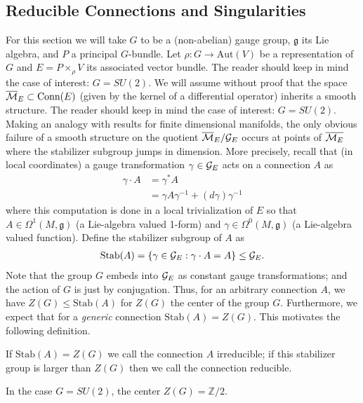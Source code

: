 \documentclass[12pt, onecolumn]{article}
\newenvironment{definition}[1][Definition]{\begin{trivlist}
\item[\hskip \labelsep {\bfseries #1}]}{\end{trivlist}}
\newenvironment{remark}[1][Remark]{\begin{trivlist}
\item[\hskip \labelsep {\bfseries #1}]}{\end{trivlist}}
\begin{document}
\subsection{Reducible Connections and Singularities}
\label{sec_redconn}
For this section we will take $G$ to be a (non-abelian) gauge group, $\mathfrak{g}$ its Lie algebra, and $P$ a principal $G$-bundle.  Let $\rho: G \rightarrow \text{Aut}(V)$ be a representation of $G$ and $E=P \times_{\rho} V$ its associated vector bundle.  The reader should keep in mind the case of interest: $G=SU(2)$.  We will assume without proof that the space $\overline{\cal{M}}_{E} \subset \text{Conn}(E)$ (given by the kernel of a differential operator) inherits a smooth structure.  The reader should keep in mind the case of interest: $G=SU(2)$.   Making an analogy with results for finite dimensional manifolds, the only obvious failure of a smooth structure on the quotient $\overline{\cal{M}}_{E}/{\cal G}_{E}$ occurs at points of $\overline{{\cal M}_{E}}$ where the stabilizer subgroup jumps in dimension.  More precisely, recall that (in local coordinates) a gauge transformation $\gamma \in {\cal G}_{E}$ acts on a connection $A$ as
\begin{align*}
\gamma \cdot A &= \gamma^*A\\
&= \gamma A \gamma^{-1} + (d\gamma) \gamma^{-1} 
\end{align*}
where this computation is done in a local trivialization of $E$ so that $A \in \Omega^{1}(M,\mathfrak{g})$ (a Lie-algebra valued 1-form) and $\gamma \in \Omega^{0}(M,\mathfrak{g})$ (a Lie-algebra valued function).  Define the stabilizer subgroup of $A$ as
\begin{align*}
\text{Stab}(A)=\left \{\gamma \in {\cal G}_{E}: \gamma \cdot A = A \right \} \leq {\cal G}_{E}.
\end{align*}
Note that the group $G$ embeds into ${\cal G}_{E}$ as constant gauge transformations; and the action of $G$ is just by conjugation.  Thus, for an arbitrary connection $A$, we have $Z(G) \leq \text{Stab}(A)$ for $Z(G)$ the center of the group $G$.  Furthermore, we expect that for a \textit{generic} connection $\text{Stab}(A)=Z(G)$.  This motivates the following definition.

\begin{definition}
If $\text{Stab}(A)=Z(G)$ we call the connection $A$ irreducible; if this stabilizer group is larger than $Z(G)$ then we call the connection reducible.
\end{definition}

\begin{remark}
In the case $G=SU(2)$, the center $Z(G)=\mathbb{Z}/2$.
\end{remark}
\end{document}
